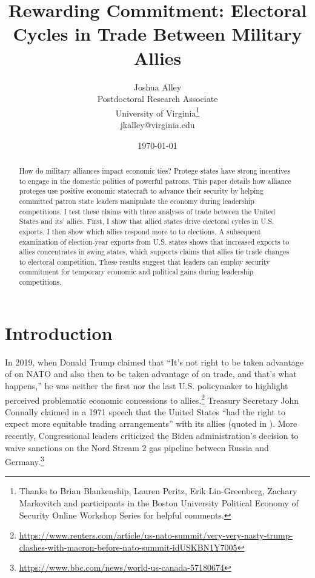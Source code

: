 \documentclass[12pt]{article}
\title{\textbf{Rewarding Commitment: Electoral Cycles in Trade Between Military Allies}}
\author{Joshua Alley \\
Postdoctoral Research Associate \\
University of Virginia\thanks{Thanks to Brian Blankenship, Lauren Peritz, Erik Lin-Greenberg, Zachary Markovitch and participants in the Boston University Political Economy of Security Online Workshop Series for helpful comments.} \\
jkalley@virginia.edu
}
\date{\today}
\begin{document}
\maketitle 

\begin{abstract}
How do military alliances impact economic ties?
Protege states have strong incentives to engage in the domestic politics of powerful patrons. 
This paper details how alliance proteges use positive economic statecraft to advance their security by helping committed patron state leaders manipulate the economy during leadership competitions.  
I test these claims with three analyses of trade between the United States and its' allies. 
First, I show that allied states drive electoral cycles in U.S. exports. 
I then show which allies respond more to to elections. 
A subsequent examination of election-year exports from U.S. states shows that increased exports to allies concentrates in swing states, which supports claims that allies tie trade changes to electoral competition.
These results suggest that leaders can employ security commitment for temporary economic and political gains during leadership competitions. 
\end{abstract} 


\newpage 
\doublespace 


\section{Introduction}

In 2019, when Donald Trump claimed that ``It's not right to be taken advantage of on NATO and also then to be taken advantage of on trade, and that's what happens,'' he was neither the first nor the last U.S. policymaker to highlight perceived problematic economic concessions to allies.\footnote{\url{https://www.reuters.com/article/us-nato-summit/very-very-nasty-trump-clashes-with-macron-before-nato-summit-idUSKBN1Y7005}}
Treasury Secretary John Connally claimed in a 1971 speech that the United States ``had the right to expect more equitable trading arrangements'' with its allies (quoted in \citet[pg 175]{Sayle2019}).
More recently, Congressional leaders criticized the Biden administration's decision to waive sanctions on the Nord Stream 2 gas pipeline between Russia and Germany.\footnote{\url{https://www.bbc.com/news/world-us-canada-57180674}}
\end{document}
